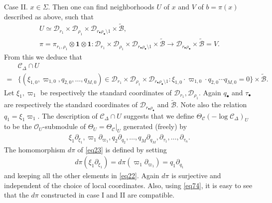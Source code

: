 \documentclass[12pt,b5paper,notitlepage]{report}
\theoremstyle{definition}
\theoremstyle{plain}
\newcommand{\mc}{\mathcal}
\newcommand{\wtd}{\widetilde}
\newcommand{\id}{\mathbf{1}}
\newcommand{\scr}{\mathscr}
\newcommand{\blt}{\bullet}
\numberwithin{equation}{section}
\begin{document}
Case II. $x\in\Sigma$. Then one can find  neighborhoods $U$ of $x$ and $V$ of $b=\pi(x)$ described as above, such that
\begin{gather*}
U\simeq \mc D_{r_1}\times \mc D_{\rho_1}\times \mc D_{r_\blt\rho_\blt\setminus 1}\times\wtd {\mc B},\\
\pi=\pi_{r_1,\rho_1}\otimes\id\otimes\id:\mc D_{r_1}\times \mc D_{\rho_1}\times \mc D_{r_\blt\rho_\blt\setminus 1}\times\wtd {\mc B}\rightarrow\mc D_{r_\blt\rho_\blt}\times\wtd{\mc B}=V.
\end{gather*}
From this we deduce that
\begin{align*}
&\mc C_\Delta\cap U\\
=&\{(\xi_{1,0},\varpi_{1,0},q_{2,0},\dots,q_{M,0})\in \mc D_{r_1}\times \mc D_{\rho_1}\times \mc D_{r_\blt\rho_\blt\setminus 1}:\xi_{1,0}\cdot\varpi_{1,0}\cdot q_{2,0}\cdots q_{M,0}=0\}\times\wtd{\mc B}.
\end{align*}
Let $\xi_1,\varpi_1$ be respectively the standard coordinates of $\mc D_{r_1},\mc D_{\rho_1}$. Again $q_\blt$ and $\tau_\blt$ are respectively the standard coordinates of $\mc D_{r_\blt\rho_\blt}$ and $\wtd {\mc B}$. Note also the relation $q_1=\xi_1\varpi_1$. The description of $\mc C_\Delta\cap U$ suggests that we define $\Theta_{\mc C}(-\log \mc C_\Delta)_U$ to be the $\scr O_U$-submodule of $\Theta_U=\Theta_{\mc C}|_U$ generated (freely) by
\begin{align}
\xi_1\partial_{\xi_1},\varpi_1\partial_{\varpi_1},q_2\partial_{q_2},\dots,q_M\partial_{q_M},\partial_{\tau_1},\dots,\partial_{\tau_n}.\label{eq22}
\end{align}
The homomorphism $d\pi$ of \eqref{eq23} is defined by setting
\begin{align}
d\pi(\xi_1\partial_{\xi_1})=d\pi(\varpi_1\partial_{\varpi_1})=q_1\partial_{q_1}\label{eq182}
\end{align}
and keeping all the other elements in \eqref{eq22}. Again $d\pi$ is surjective and independent of the choice of local coordinates. Also, using \eqref{eq74}, it is easy to see that the $d\pi$ constructed in case I and II are compatible.
\end{document}
